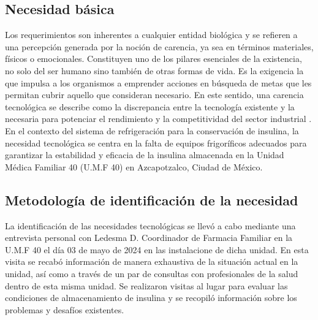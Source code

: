\subsection{Necesidad básica}\rsp{}
Los requerimientos son inherentes a cualquier entidad biológica y se refieren a una percepción generada por la noción de carencia, ya sea en términos materiales, físicos o emocionales. Constituyen uno de los pilares esenciales de la existencia, no solo del ser humano sino también de otras formas de vida. Es la exigencia la que impulsa a los organismos a emprender acciones en búsqueda de metas que les permitan cubrir aquello que consideran necesario.
En este sentido, una carencia tecnológica se describe como la discrepancia entre la tecnología existente y la necesaria para potenciar el rendimiento y la competitividad del sector industrial \cite{marrelli-2011,imp-2018}.\\
 En el contexto del sistema de refrigeración para la conservación de insulina, la necesidad tecnológica se centra en la falta de equipos frigoríficos adecuados para garantizar la estabilidad y eficacia de la insulina almacenada en  la Unidad Médica Familiar 40 (U.M.F 40) en Azcapotzalco, Ciudad de México.
\subsection{Metodología de identificación de la necesidad}
La identificación de las necesidades tecnológicas se llevó a cabo mediante una entrevista personal con Ledesma D. Coordinador de Farmacia Familiar en la U.M.F 40 el día 03 de mayo de 2024 en las instalacione de dicha unidad. En esta visita se recabó información de manera exhaustiva de la situación actual en la unidad, así como a través de un par de consultas con profesionales de la salud dentro de esta misma unidad. Se realizaron visitas al lugar para evaluar las condiciones de almacenamiento de insulina y se recopiló información sobre los problemas y desafíos existentes.


